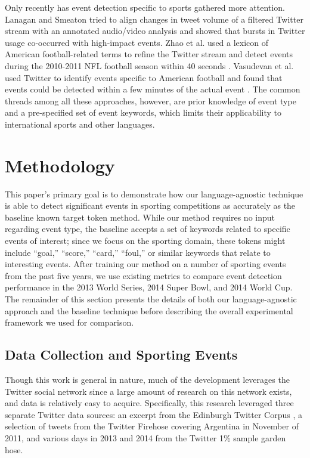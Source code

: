 \documentclass{acm_proc_article-sp}
\begin{document}
{Only recently has event detection specific to sports gathered more attention.
Lanagan and Smeaton tried to align changes in tweet volume of a filtered Twitter stream with an annotated audio/video analysis and showed that bursts in Twitter usage co-occurred with high-impact events\cite{lanagan2011using}.
Zhao et al. used a lexicon of American football-related terms to refine the Twitter stream and detect events during the 2010-2011 NFL football season within 40 seconds \cite{Zhao2011}.
Vasudevan et al. used Twitter to identify events specific to American football and found that events could be detected within a few minutes of the actual event \cite{vasudevan2013twitter}.
The common threads among all these approaches, however, are prior knowledge of event type and a pre-specified set of event keywords, which limits their applicability to international sports and other languages.
}

\section{Methodology}

This paper's primary goal is to demonstrate how our language-agnostic technique is able to detect significant events in sporting competitions as accurately as the baseline known target token method.
While our method requires no input regarding event type, the baseline accepts a set of keywords related to specific events of interest; since we focus on the sporting domain, these tokens might include ``goal,'' ``score,'' ``card,'' ``foul,'' or similar keywords that relate to interesting events.
After training our method on a number of sporting events from the past five years, we use existing metrics to compare event detection performance in the 2013 World Series, 2014 Super Bowl, and 2014 World Cup.
The remainder of this section presents the details of both our language-agnostic approach and the baseline technique before describing the overall experimental framework we used for comparison.

\subsection{Data Collection and Sporting Events}

Though this work is general in nature, much of the development leverages the Twitter social network since a large amount of research on this network exists, and data is relatively easy to acquire.
Specifically, this research leveraged three separate Twitter data sources: an excerpt from the Edinburgh Twitter Corpus \cite{Petrovic:2010:ETC:1860667.1860680}, a selection of tweets from the Twitter Firehose covering Argentina in November of 2011, and various days in 2013 and 2014 from the Twitter 1\% sample garden hose.
\end{document}
